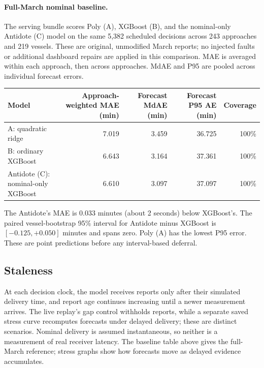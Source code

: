 \documentclass[11pt]{article}
\begin{document}
\paragraph{Full-March nominal baseline.}
The serving bundle scores Poly (A), XGBoost (B), and the nominal-only Antidote (C) model on the same 5,382 scheduled decisions across 243 approaches and 219 vessels. These are original, unmodified March reports; no injected faults or additional dashboard repairs are applied in this comparison. MAE is averaged within each approach, then across approaches. MdAE and P95 are pooled across individual forecast errors.
\begin{table}[!htbp]
\centering\small
\begin{tabular}{@{}lrrrr@{}}
\toprule
Model & Approach-weighted MAE (min) & Forecast MdAE (min) & Forecast P95 AE (min) & Coverage \\
\midrule
A: quadratic ridge & 7.019 & 3.459 & 36.725 & 100\% \\
B: ordinary XGBoost & 6.643 & 3.164 & 37.361 & 100\% \\
Antidote (C): nominal-only XGBoost & 6.610 & 3.097 & 37.097 & 100\% \\
\bottomrule
\end{tabular}
\end{table}
The Antidote's MAE is 0.033 minutes (about 2 seconds) below XGBoost's. The paired vessel-bootstrap 95\% interval for Antidote minus XGBoost is $[-0.125,+0.050]$ minutes and spans zero. Poly (A) has the lowest P95 error. These are point predictions before any interval-based deferral.

\subsection{Staleness}
At each decision clock, the model receives reports only after their simulated delivery time, and report age continues increasing until a newer measurement arrives. The live replay's gap control withholds reports, while a separate saved stress curve recomputes forecasts under delayed delivery; these are distinct scenarios. Nominal delivery is assumed instantaneous, so neither is a measurement of real receiver latency. The baseline table above gives the full-March reference; stress graphs show how forecasts move as delayed evidence accumulates.
\end{document}

